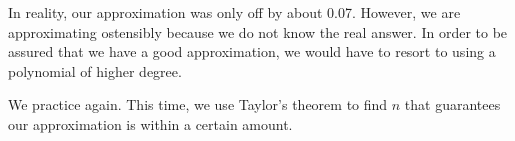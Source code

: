 {\begin{enumerate}
In reality, our approximation was only off by about 0.07. However, we are approximating ostensibly because we do not know the real answer. In order to be assured that we have a good approximation, we would have to resort to using a polynomial of higher degree.
\end{enumerate}
\baselineskip
}

\medskip

We practice again. This time, we use Taylor's theorem to find $n$ that guarantees our approximation is within a certain amount.\\

